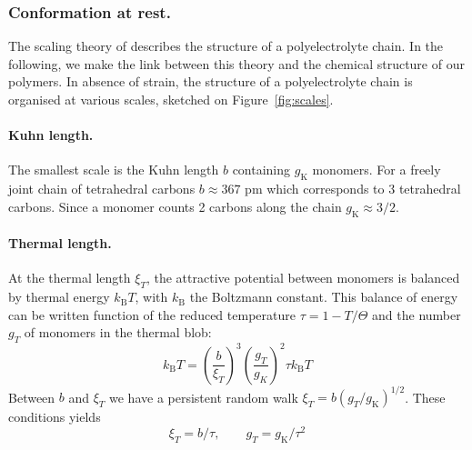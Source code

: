 \documentclass[twoside,twocolumn,9pt]{article}
\begin{document}
\subsubsection{Conformation at rest.}
The scaling theory of \citet{Dobrynin1995} describes the structure of a polyelectrolyte chain. In the following, we make the link between this theory and the chemical structure of our polymers. In absence of strain, the structure of a polyelectrolyte chain is organised at various scales, sketched on Figure~\ref{fig:scales}.

\paragraph{Kuhn length.}
The smallest scale is the Kuhn length $b$ containing $g_\mathrm{K}$ monomers. For a freely joint chain of tetrahedral carbons $b\approx 367$ pm which corresponds to 3 tetrahedral carbons. Since a monomer counts 2 carbons along the chain $g_\mathrm{K}\approx 3/2$.

\paragraph{Thermal length.}
At the thermal length $\xi_T$, the attractive potential between monomers is balanced by thermal energy $k_\mathrm{B}T$, with $k_\mathrm{B}$ the Boltzmann constant. This balance of energy can be written function of the reduced temperature $\tau = 1 -T/\Theta$ and the number $g_T$ of monomers in the thermal blob:
\begin{equation}
k_\mathrm{B}T = \left(\frac{b}{\xi_T}\right)^3\left(\frac{g_T}{g_K}\right)^2 \tau k_\mathrm{B}T 
\label{eq:poorkT}
\end{equation}
Between $b$ and $\xi_T$ we have a persistent random walk $\xi_T = b (g_T/g_\mathrm{K})^{1/2}$. These conditions yields 
\begin{equation}
\xi_T = b/\tau,\qquad g_T = g_\mathrm{K}/\tau^2
\label{eq:thermal}
\end{equation}
\end{document}
